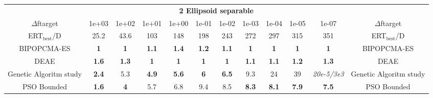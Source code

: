 \begin{tabular}{cccccccccccc}
 & \multicolumn{10}{c}{{\normalsize \textbf{2 Ellipsoid separable}}}\\
$\Delta$ftarget& 1e+03& 1e+02& 1e+01& 1e+00& 1e-01& 1e-02& 1e-03& 1e-04& 1e-05& 1e-07 & $\Delta$ftarget \\
ERT$_{\textrm{best}}$/D& 25.2& 43.6& 103& 148& 198& 243& 272& 297& 315& 351 & ERT$_{\textrm{best}}$/D \\
\hline
BIPOPCMA-ES & \textbf{1} & \textbf{1} & \textbf{1.1} & \textbf{1.4} & \textbf{1.2} & \textbf{1.1} & \textbf{1} & \textbf{1} & \textbf{1} & \textbf{1} & BIPOPCMA-ES \cite{add_an_entry_for_BIPOPCMA-ES_in_bbob.bib}\\
DEAE & \textbf{1.6} & \textbf{1.3} & \textbf{1} & \textbf{1} & \textbf{1} & \textbf{1} & \textbf{1.1} & \textbf{1.1} & \textbf{1.2} & \textbf{1.3} & DEAE \cite{add_an_entry_for_DEAE_in_bbob.bib}\\
Genetic Algoritm study & \textbf{2.4} & 5.3 & \textbf{4.9} & \textbf{5.6} & \textbf{6} & \textbf{6.5} & 9.3 & 24 & 39 & \textit{20e-5}\textit{/3e3} & Genetic Algoritm study \cite{add_an_entry_for_Genetic Algoritm study_in_bbob.bib}\\
PSO Bounded & \textbf{1.6} & \textbf{4} & 5.7 & 6.8 & 9.4 & 8.5 & \textbf{8.3} & \textbf{8.1} & \textbf{7.9} & \textbf{7.5} & PSO Bounded \cite{add_an_entry_for_PSO Bounded_in_bbob.bib}
\end{tabular}
